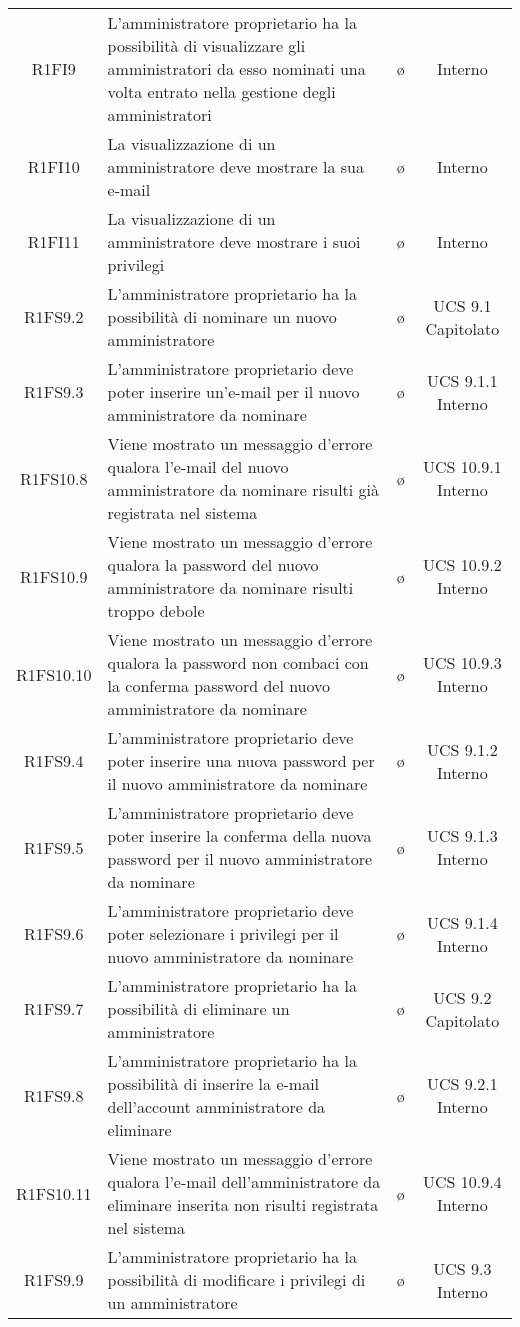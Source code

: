{\begin{longtable}{ c C{4cm} c c}
R1FI9 & L'amministratore proprietario ha la possibilità di visualizzare gli amministratori da esso nominati una volta entrato nella gestione degli amministratori & \o & Interno \\
R1FI10 & La visualizzazione di un amministratore deve mostrare la sua e-mail & \o & Interno \\
R1FI11 & La visualizzazione di un amministratore deve mostrare i suoi privilegi & \o & Interno \\
R1FS9.2 & L'amministratore proprietario ha la possibilità di nominare un nuovo amministratore & \o & UCS 9.1 Capitolato\\
R1FS9.3 & L'amministratore proprietario deve poter inserire un'e-mail per il nuovo amministratore da nominare & \o & UCS 9.1.1 Interno\\
R1FS10.8 & Viene mostrato un messaggio d'errore qualora l'e-mail del nuovo amministratore da nominare risulti già registrata nel sistema & \o & UCS 10.9.1 Interno\\
R1FS10.9 & Viene mostrato un messaggio d'errore qualora la password del nuovo amministratore da nominare risulti troppo debole & \o & UCS 10.9.2 Interno\\
R1FS10.10 & Viene mostrato un messaggio d'errore qualora la password non combaci con la conferma password del nuovo amministratore da nominare & \o & UCS 10.9.3 Interno\\
R1FS9.4 & L'amministratore proprietario deve poter inserire una nuova password per il nuovo amministratore da nominare & \o & UCS 9.1.2 Interno\\
R1FS9.5 & L'amministratore proprietario deve poter inserire la conferma della nuova password per il nuovo amministratore da nominare & \o & UCS 9.1.3 Interno\\
R1FS9.6 & L'amministratore proprietario deve poter selezionare i privilegi per il nuovo amministratore da nominare & \o & UCS 9.1.4 Interno\\
R1FS9.7 & L'amministratore proprietario ha la possibilità di eliminare un amministratore & \o & UCS 9.2 Capitolato\\
R1FS9.8 & L'amministratore proprietario ha la possibilità di inserire la e-mail dell'account amministratore da eliminare & \o & UCS 9.2.1 Interno\\
R1FS10.11 & Viene mostrato un messaggio d'errore qualora l'e-mail dell'amministratore da eliminare inserita non risulti registrata nel sistema & \o & UCS 10.9.4 Interno\\
R1FS9.9 & L'amministratore proprietario ha la possibilità di modificare i privilegi di un amministratore & \o & UCS 9.3 Interno\\

\end{longtable}}
